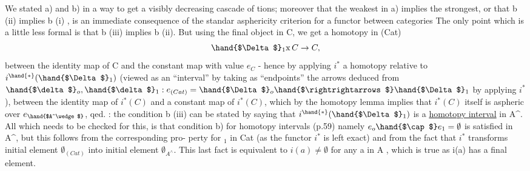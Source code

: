 We stated a) and b) in a way to get a visibly decreasing cascade of
tions;  moreover that the weakest in a) implies the strongest,  or
that b (ii) implies b (i) , is an immediate consequence of the standar
asphericity criterion for a functor between categories  The only point
which is a little less formal is that  b (iii)  implies b (ii).  But
using the final object in C,  we get  a homotopy  in (Cat) 
\[ \hand{$\Delta$}_1 \mathrm{x}\, C \rightarrow C , \]
between the identity map of C and the constant map with value $e_C$  - hence
by applying $i^{*}$\hand{,} a homotopy  relative to  $i^{\hand{*}}(\hand{$\Delta$}_1)$  (viewed as an ``interval''
by taking as ``endpoints'' the arrows deduced from $\hand{$\delta$}_o,\hand{$\delta$}_1 : e_{(Cat)} = \hand{$\Delta$}_o \hand{$\rightrightarrows$} \hand{$\Delta$}_1$
by applying $i^{*}$ ),  between the identity map of $i^{*}(C)$ and a constant map
of $i^{*}(C)$,  which by the  homotopy lemma implies that $i^{*}(C)$ itself is
aspheric over $e_{\hand{$A^\wedge$}}$,  qed.
:    the condition  b (iii) can be stated by saying that $i^{\hand{*}}(\hand{$\Delta$}_1)$
is a \uline{homotopy interval} in A\^{}.  All which needs to be checked for this, is
that  condition  b) for homotopy intervals  (p.59) namely $e_o \hand{$\cap$} e_1 = \emptyset$  is
satisfied in A\^{},  but this follows from the corresponding  pro-%
perty for \hand{$\Delta$}$_1$ in Cat (as the functor $i^{*}$ is left exact) and from the fact
that $i^{*}$ transforms initial element $\emptyset_{(Cat)}$ into initial element $\emptyset_{A^\wedge}$.  This
last fact is equivalent to $i(a) \neq \emptyset$ for any a in A , which is true as
i(a) has a final element.
